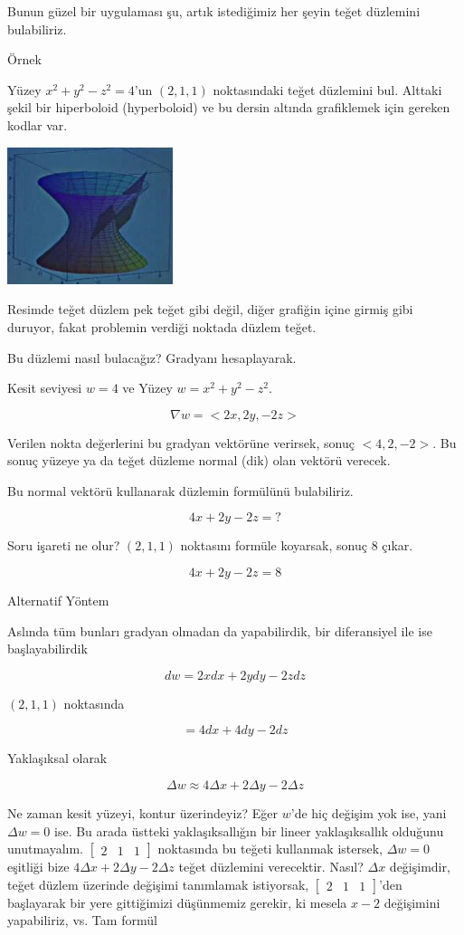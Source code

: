 \documentclass[12pt,fleqn]{article}\usepackage{../../common}
\begin{document}
Bunun güzel bir uygulaması şu, artık istediğimiz her şeyin teğet düzlemini
bulabiliriz. 

Örnek

Yüzey $x^2 + y^2 - z^2 = 4$'un $(2,1,1)$ noktasındaki teğet düzlemini
bul. Alttaki şekil bir hiperboloid (hyperboloid) ve bu dersin altında
grafiklemek için gereken kodlar var.

\includegraphics[height=4cm]{12_5.jpg}

Resimde teğet düzlem pek teğet gibi değil, diğer grafiğin içine girmiş gibi
duruyor, fakat problemin verdiği noktada düzlem teğet. 

Bu düzlemi nasıl bulacağız? Gradyanı hesaplayarak. 

Kesit seviyesi $w=4$ ve Yüzey $w = x^2 + y^2 - z^2$. 

$$ \nabla w = <2x, 2y, -2z> $$

Verilen nokta değerlerini bu gradyan vektörüne verirsek, sonuç
$< 4,2,-2 >$. Bu sonuç yüzeye ya da teğet düzleme normal (dik) olan 
vektörü verecek. 

Bu normal vektörü kullanarak düzlemin formülünü bulabiliriz. 

$$ 4x + 2y - 2z = ? $$

Soru işareti ne olur? $(2,1,1)$ noktasını formüle koyarsak, sonuç 8 çıkar.

$$ 4x + 2y - 2z = 8 $$

Alternatif Yöntem

Aslında tüm bunları gradyan olmadan da yapabilirdik, bir diferansiyel ile
ise başlayabilirdik

$$ dw = 2x dx + 2y dy -2z dz $$

$(2,1,1)$ noktasında

$$ = 4dx + 4dy - 2dz $$

Yaklaşıksal olarak 

$$ \Delta w \approx 4 \Delta x + 2\Delta y - 2\Delta z  $$

Ne zaman kesit yüzeyi, kontur üzerindeyiz? Eğer $w$'de hiç değişim yok ise, yani
$\Delta w = 0$ ise. Bu arada üstteki yaklaşıksallığın bir lineer yaklaşıksallık
olduğunu unutmayalım. $[\begin{array}{ccc} 2&1&1 \end{array}]$ noktasında bu teğeti kullanmak istersek,
$\Delta w = 0$ eşitliği bize $4 \Delta x + 2 \Delta y - 2 \Delta z$ teğet düzlemini
verecektir. Nasıl? $\Delta x$ değişimdir, teğet düzlem üzerinde değişimi
tanımlamak istiyorsak, $[\begin{array}{ccc} 2&1&1 \end{array}]$'den başlayarak
bir yere gittiğimizi düşünmemiz gerekir, ki mesela $x-2$ değişimini yapabiliriz,
vs. Tam formül
\end{document}
